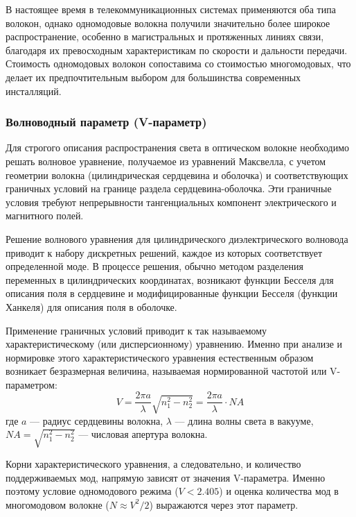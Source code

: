 В настоящее время в телекоммуникационных системах применяются оба типа волокон, однако одномодовые волокна получили значительно более широкое распространение, особенно в магистральных и протяженных линиях связи, благодаря их превосходным характеристикам по скорости и дальности передачи. Стоимость одномодовых волокон сопоставима со стоимостью многомодовых, что делает их предпочтительным выбором для большинства современных инсталляций.

\subsubsection{Волноводный параметр (V-параметр)}
Для строгого описания распространения света в оптическом волокне необходимо решать волновое уравнение, получаемое из уравнений Максвелла, с учетом геометрии волокна (цилиндрическая сердцевина и оболочка) и соответствующих граничных условий на границе раздела сердцевина-оболочка. Эти граничные условия требуют непрерывности тангенциальных компонент электрического и магнитного полей.

Решение волнового уравнения для цилиндрического диэлектрического волновода приводит к набору дискретных решений, каждое из которых соответствует определенной моде. В процессе решения, обычно методом разделения переменных в цилиндрических координатах, возникают функции Бесселя для описания поля в сердцевине и модифицированные функции Бесселя (функции Ханкеля) для описания поля в оболочке.

Применение граничных условий приводит к так называемому характеристическому (или дисперсионному) уравнению. Именно при анализе и нормировке этого характеристического уравнения естественным образом возникает безразмерная величина, называемая нормированной частотой или V-параметром:
\begin{equation}
    V = \frac{2\pi a}{\lambda} \sqrt{n_1^2 - n_2^2} = \frac{2\pi a}{\lambda} \cdot NA
\end{equation}
где $a$ — радиус сердцевины волокна, $\lambda$ — длина волны света в вакууме, $NA = \sqrt{n_1^2 - n_2^2}$ — числовая апертура волокна.

Корни характеристического уравнения, а следовательно, и количество поддерживаемых мод, напрямую зависят от значения V-параметра. Именно поэтому условие одномодового режима ($V < 2.405$) и оценка количества мод в многомодовом волокне ($N \approx V^2/2$) выражаются через этот параметр.

